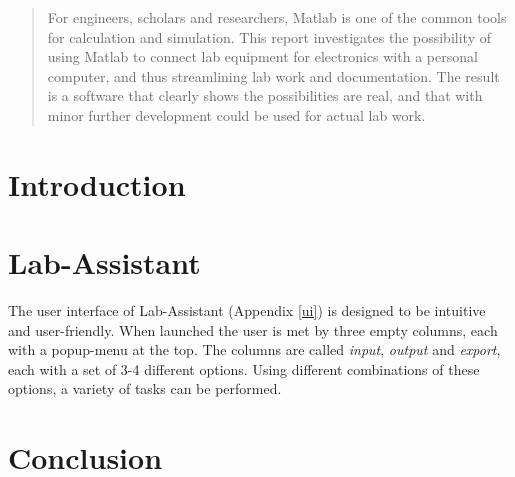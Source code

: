 \documentclass[twocolumn]{article}
\begin{document}
\pagestyle{fancy}
\fancyfoot[c]{}

\onecolumn
\begin{abstract}
For engineers, scholars and researchers, Matlab is one of the common tools for calculation and simulation. This report investigates the possibility of using Matlab to connect lab equipment for electronics with a personal computer, and thus streamlining lab work and documentation. The result is a software that clearly shows the possibilities are real, and that with minor further development could be used for actual lab work.
\end{abstract}
\clearpage

\tableofcontents
\clearpage
\setcounter{page}{1}
\fancyfoot[c]{\thepage}
\twocolumn


\section{Introduction}



\section{Lab-Assistant}
The user interface of Lab-Assistant (Appendix \ref{ui}) is designed to be intuitive and user-friendly. When launched the user is met by three empty columns, each with a popup-menu at the top. The columns are called \emph{input}, \emph{output} and \emph{export}, each with a set of 3-4 different options. Using different combinations of these options, a variety of tasks can be performed.







\section{Conclusion}


\onecolumn
\appendix
\setcounter{page}{1}
\renewcommand{\thepage}{\Roman{page}}
\end{document}
